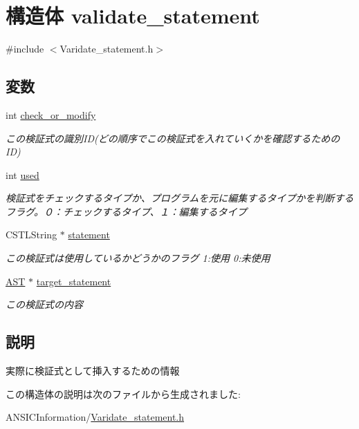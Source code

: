 \section{構造体 validate\_\-statement}
\label{structvalidate__statement}


{\ttfamily \#include $<$Varidate\_\-statement.h$>$}

\subsection*{変数}
\begin{DoxyCompactItemize}
\item 
int \hyperlink{structvalidate__statement_af811a34ac79801a37cfa0c5ce2f92d48}{check\_\-or\_\-modify}\label{structvalidate__statement_af811a34ac79801a37cfa0c5ce2f92d48}

\begin{DoxyCompactList}\small\item\em この検証式の識別ID(どの順序でこの検証式を入れていくかを確認するためのID) \item\end{DoxyCompactList}\item 
int \hyperlink{structvalidate__statement_ad707b113b11d4a04d6950ec7581e52f2}{used}\label{structvalidate__statement_ad707b113b11d4a04d6950ec7581e52f2}

\begin{DoxyCompactList}\small\item\em 検証式をチェックするタイプか、プログラムを元に編集するタイプかを判断するフラグ。０：チェックするタイプ、１：編集するタイプ \item\end{DoxyCompactList}\item 
CSTLString $\ast$ \hyperlink{structvalidate__statement_a2c7d107cd83b73d65b9c6b7919b5f48e}{statement}\label{structvalidate__statement_a2c7d107cd83b73d65b9c6b7919b5f48e}

\begin{DoxyCompactList}\small\item\em この検証式は使用しているかどうかのフラグ 1:使用 0:未使用 \item\end{DoxyCompactList}\item 
\hyperlink{structabstract__syntax__tree}{AST} $\ast$ \hyperlink{structvalidate__statement_a97f962c68638a36d8d3ef5d52f017f84}{target\_\-statement}\label{structvalidate__statement_a97f962c68638a36d8d3ef5d52f017f84}

\begin{DoxyCompactList}\small\item\em この検証式の内容 \item\end{DoxyCompactList}\end{DoxyCompactItemize}


\subsection{説明}
実際に検証式として挿入するための情報 

この構造体の説明は次のファイルから生成されました:\begin{DoxyCompactItemize}
\item 
ANSICInformation/\hyperlink{Varidate__statement_8h}{Varidate\_\-statement.h}\end{DoxyCompactItemize}
